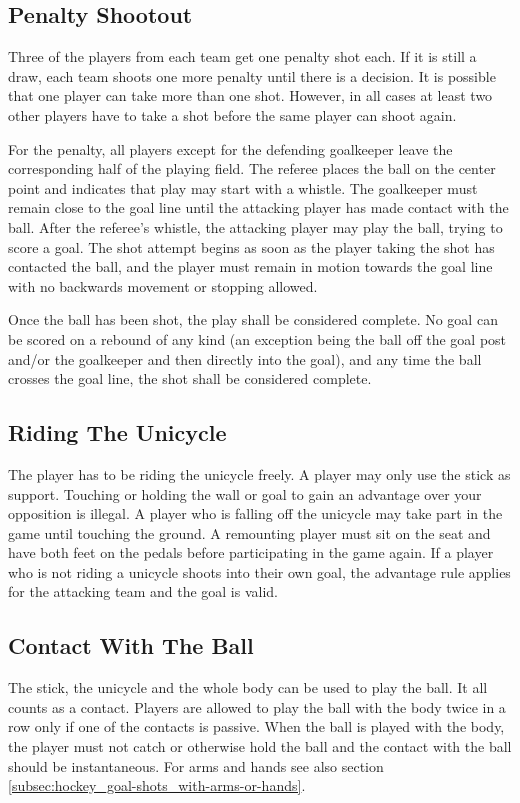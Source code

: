 \subsection{Penalty Shootout}\label{subsec:hockey_penalty_shootout}
Three of the players from each team get one penalty shot each.
If it is still a draw, each team shoots one more penalty until there is a decision.
It is possible that one player can take more than one shot.
However, in all cases at least two other players have to take a shot before the same player can shoot again.

For the penalty, all players except for the defending goalkeeper leave the corresponding half of the playing field.
The referee places the ball on the center point and indicates that play may start with a whistle.
The goalkeeper must remain close to the goal line until the attacking player has made contact with the ball.
After the referee's whistle, the attacking player may play the ball, trying to score a goal.
The shot attempt begins as soon as the player taking the shot has contacted the ball, and the player must remain in motion towards the goal line with no backwards movement or stopping allowed.

Once the ball has been shot, the play shall be considered complete.
No goal can be scored on a rebound of any kind (an exception being the ball off the goal post and/or the goalkeeper and then directly into the goal), and any time the ball crosses the goal line, the shot shall be considered complete.

\subsection{Riding The Unicycle}
The player has to be riding the unicycle freely.
A player may only use the stick as support.
Touching or holding the wall or goal to gain an advantage over your opposition is illegal. 
A player who is falling off the unicycle may take part in the game until touching the ground.
A remounting player must sit on the seat and have both feet on the pedals before participating in the game again.
If a player who is not riding a unicycle shoots into their own goal, the advantage rule applies for the attacking team and the goal is valid.

\subsection{Contact With The Ball}
The stick, the unicycle and the whole body can be used to play the ball.
It all counts as a contact.
Players are allowed to play the ball with the body twice in a row only if one of the contacts is passive.
When the ball is played with the body, the player must not catch or otherwise hold the ball and the contact with the ball should be instantaneous.
For arms and hands see also section \ref{subsec:hockey_goal-shots_with-arms-or-hands}.

